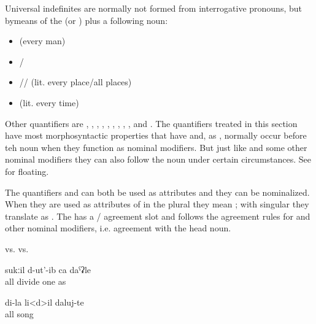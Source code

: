 Universal indefinites are normally not formed from interrogative pronouns, but by\linebreak means of the    (or  ) plus a following noun:

\begin{itemize}
	\item	{}  (every man)
	\item	{}\slash{} 
	\item	{}\slash{}\slash{}  (lit. every place\slash all places)
	\item	{}  (lit. every time)
\end{itemize}
%

Other quantifiers are ,  , , , ,  , , ,  , and  . The quantifiers treated in this section have most morphosyntactic properties that  have and, as , normally occur before teh noun when they function as nominal modifiers. But just like  and some other nominal modifiers they can also follow the noun under certain circumstances. See  for  floating. 

The quantifiers  and  can both be used as attributes and they can be nominalized. When they are used as attributes of  in the plural they mean ; with singular  they translate as . The   has a / agreement slot and follows the agreement rules for  and other nominal modifiers, i.e. agreement with the head noun.

\begin{exe}
	\ex	\label{ex:all girls all houses}
	\begin{xlist}
		\TabPositions{10.5em,12.5em}
		\ex	{} 		\tab	vs.	\tab	{} 
		\ex	{}		\tab	vs.	\tab	{} 
	\end{xlist}

	\ex	\label{ex:He divided all (the bread) like one (i.e. everyone got the same amount of bread)}
	\gll	sukːil	d-ut'-ib	ca	daˁʡle\\
		all	divide	one	as\\
	\glt	{}

	\ex	
	\gll	di-la	li<d>il	daluj-te\\
			all	song\\
	\glt	{}
\end{exe}

